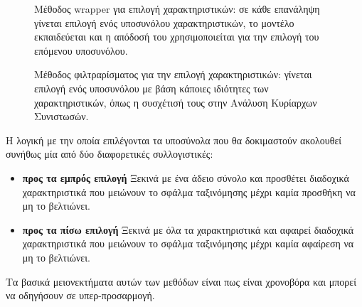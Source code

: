 \begin{figure}[!htb]
	\begin{minipage}{0.45\textwidth}
		\caption[Μέθοδος wrapper για επιλογή χαρακτηριστικών]{Μέθοδος wrapper για επιλογή χαρακτηριστικών: σε κάθε επανάληψη γίνεται επιλογή ενός υποσυνόλου χαρακτηριστικών, το μοντέλο εκπαιδεύεται και η απόδοσή του χρησιμοποιείται για την επιλογή του επόμενου υποσυνόλου.}
		\label{fig:wrapper}
	\end{minipage} \qquad
	\begin{minipage}{0.45\textwidth}
		\caption[Μέθοδος φιλτραρίσματος για την επιλογή χαρακτηριστικών]{Μέθοδος φιλτραρίσματος για την επιλογή χαρακτηριστικών: γίνεται επιλογή ενός υποσυνόλου με βάση κάποιες ιδιότητες των χαρακτηριστικών, όπως η συσχέτισή τους στην Ανάλυση Κυρίαρχων Συνιστωσών.}
	\end{minipage}
\end{figure}

Η λογική με την οποία επιλέγονται τα υποσύνολα που θα δοκιμαστούν ακολουθεί συνήθως μία από δύο διαφορετικές συλλογιστικές:
\begin{itemize}
	\item \textbf{προς τα εμπρός επιλογή} Ξεκινά με ένα άδειο σύνολο και προσθέτει διαδοχικά χαρακτηριστικά που μειώνουν το σφάλμα ταξινόμησης μέχρι καμία προσθήκη να μη το βελτιώνει.
	\item \textbf{προς τα πίσω επιλογή} Ξεκινά με όλα τα χαρακτηριστικά και αφαιρεί διαδοχικά χαρακτηριστικά που μειώνουν το σφάλμα ταξινόμησης μέχρι καμία αφαίρεση να μη το βελτιώνει.
\end{itemize}
Τα βασικά μειονεκτήματα αυτών των μεθόδων είναι πως είναι χρονοβόρα και μπορεί να οδηγήσουν σε υπερ-προσαρμογή.

